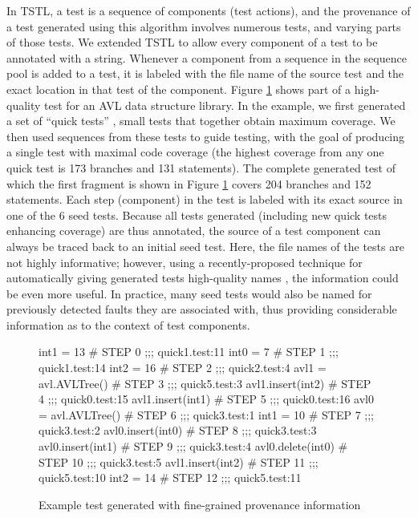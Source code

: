 \documentclass[final]{article}
\begin{document}
In TSTL, a test is a sequence of components (test actions), and the
provenance of a test generated using this algorithm involves numerous
tests, and varying parts of those tests.  We extended TSTL to allow
every component of a test to be annotated with a string.  Whenever a
component from a sequence in the sequence pool is added to a test, it
is labeled with the file name of the source test and the exact
location in that test of the component.  Figure \ref{fig:example}
shows part of a high-quality test for an AVL data structure library.  In the
example, we first generated a set of ``quick tests''
\cite{icst2014,stvrcausereduce}, small tests that together obtain
maximum coverage.  We then used sequences from these tests to guide
testing, with the goal of producing a single test with maximal code
coverage (the highest coverage from any one quick test is 173 branches
and 131 statements).  The complete generated test of which the first fragment
is shown in Figure \ref{fig:example}
covers 204 branches and 152 statements.  Each step (component) in the
test is labeled with its exact source in one of the 6 seed tests.
Because all tests generated (including new quick tests enhancing
coverage) are thus annotated, the source of a test component can always be
traced back to an initial seed test.  Here, the file names of the
tests are not highly informative; however, using a recently-proposed
technique for automatically giving generated tests high-quality names
\cite{Daka:2017:GUT:3092703.3092727}, the information could be even
more useful.  In practice, many seed tests would also be named for
previously detected faults they are associated with, thus providing
considerable information as to the context of test components.

\begin{figure}
{\scriptsize
\begin{code}
int1 = 13                   \# STEP 0   ;;; quick1.test:11
int0 = 7                    \# STEP 1   ;;; quick1.test:14
int2 = 16                   \# STEP 2   ;;; quick2.test:4
avl1 = avl.AVLTree()        \# STEP 3   ;;; quick5.test:3
avl1.insert(int2)           \# STEP 4   ;;; quick0.test:15
avl1.insert(int1)           \# STEP 5   ;;; quick0.test:16
avl0 = avl.AVLTree()        \# STEP 6   ;;; quick3.test:1
int1 = 10                   \# STEP 7   ;;; quick3.test:2
avl0.insert(int0)           \# STEP 8   ;;; quick3.test:3
avl0.insert(int1)           \# STEP 9   ;;; quick3.test:4
avl0.delete(int0)           \# STEP 10  ;;; quick3.test:5
avl1.insert(int2)           \# STEP 11  ;;; quick5.test:10
int2 = 14                   \# STEP 12  ;;; quick5.test:11
\end{code}
}
\caption{Example test generated with fine-grained provenance information}
\label{fig:example}
\end{figure}
\end{document}
